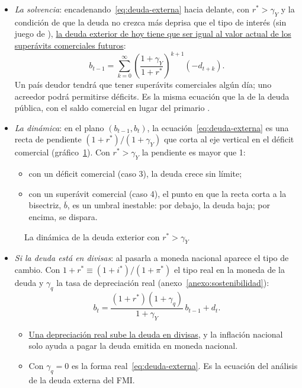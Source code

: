 \documentclass[11pt]{article}
\begin{document}
\begin{itemize}
\item \emph{La solvencia}: encadenando~\eqref{eq:deuda-externa} hacia delante, con $r^*>\gamma_Y$ y la condición de que la deuda no crezca más deprisa que el tipo de interés (sin juego de ), \uline{la deuda exterior de hoy tiene que ser igual al valor actual de los superávits comerciales futuros}:
  \begin{equation}\label{eq:solvencia-externa}
  b_{t-1}=\sum_{k=0}^{\infty}\left(\frac{1+\gamma_Y}{1+r^*}\right)^{k+1}\left(-d_{t+k}\right).
  \end{equation}
  Un país deudor tendrá que tener superávits comerciales algún día; uno acreedor podrá permitirse déficits. Es la misma ecuación que la de la deuda pública, con el saldo comercial en lugar del primario .
\item \emph{La dinámica}: en el plano $(b_{t-1},b_t)$, la ecuación~\eqref{eq:deuda-externa} es una recta de pendiente $(1+r^*)/(1+\gamma_Y)$ que corta al eje vertical en el déficit comercial (gráfico~\ref{fig:dinamica-deuda-externa}). Con $r^*>\gamma_Y$ la pendiente es mayor que 1:
  \begin{itemize}
  \item con un déficit comercial (caso 3), la deuda crece sin límite;
  \item con un superávit comercial (caso 4), el punto en que la recta corta a la bisectriz, $\overline b$, es un umbral inestable: por debajo, la deuda baja; por encima, se dispara.
  \end{itemize}
\end{itemize}

\begin{figure}[H]
\centering
\caption{La dinámica de la deuda exterior con $r^*>\gamma_Y$}\label{fig:dinamica-deuda-externa}
\end{figure}

\begin{itemize}
\item \emph{Si la deuda está en divisas}: al pasarla a moneda nacional aparece el tipo de cambio. Con $1+r^*\equiv(1+i^*)/(1+\pi^*)$ el tipo real en la moneda de la deuda y $\gamma_q$ la tasa de depreciación real (anexo~\ref{anexo:sostenibilidad}):
  \begin{equation}\label{eq:deuda-divisas}
  b_t=\frac{(1+r^*)(1+\gamma_q)}{1+\gamma_Y}\,b_{t-1}+d_t .
  \end{equation}
  \begin{itemize}
  \item \uline{Una depreciación real sube la deuda en divisas}, y la inflación nacional solo ayuda a pagar la deuda emitida en moneda nacional.
  \item Con $\gamma_q=0$ es la forma real~\eqref{eq:deuda-externa}. Es la ecuación del análisis de la deuda externa del FMI\nocite{FMI2008DSAMAC}.
  \end{itemize}
\end{itemize}
\end{document}
